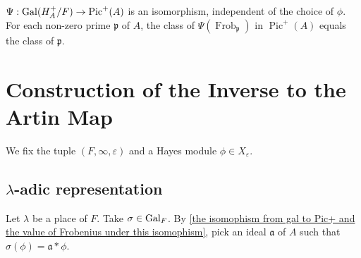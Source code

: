 \documentclass{article}
\DeclareMathOperator{\pic}{Pic}
\DeclareMathOperator{\frob}{Frob}
\begin{document}
\begin{proposition}\label{the isomophism from gal to Pic+ and the value of Frobenius under this isomophism}
    $\Psi : \gal(H_A^+/F)\to \pic^+(A)$ is an isomorphism, independent of the choice of $\phi$.
    For each non-zero prime $\mathfrak{p}$ of $A$,
    the class of $\Psi(\frob_\mathfrak{p})$ in $\pic^+(A)$ equals the class of $\mathfrak{p}$.
\end{proposition}


\section{Construction of the Inverse to the Artin Map}
We fix the tuple $(F, \infty, \varepsilon)$
and a Hayes module $\phi\in X_\varepsilon$.
\subsection{\texorpdfstring{$\lambda$}{lambda}-adic representation}
Let $\lambda$ be a place of $F$.
Take $\sigma\in\operatorname{Gal}_F$. By \cref{the isomophism from gal to Pic+ and the value of Frobenius under this isomophism}, pick an ideal $\mathfrak{a}$ of $A$ such that $\sigma(\phi) = \mathfrak{a} * \phi$.
\end{document}
